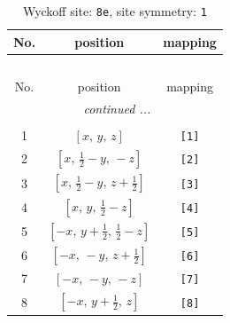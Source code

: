 \documentclass[fleqn,8pt]{jsarticle}
\begin{document}
\renewcommand{\arraystretch}{1.2}
\begin{longtable}{ccc}
\caption{Wyckoff site: {\tt 8e}, site symmetry: {\tt 1}}
 \\
 \hline \hline
No. & position & mapping \\ \hline \endfirsthead

\multicolumn{2}{l}{\tablename\ \thetable{}} \\
 \hline \hline
No. & position & mapping \\ \hline \endhead

 \hline \hline
\multicolumn{2}{r}{\footnotesize\it continued ...} \\ \endfoot

 \hline \hline
\multicolumn{2}{r}{} \\ \endlastfoot

1 & $\left[ x,\, y,\, z \right]$ & {\tt [1]} \\ \hline
2 & $\left[ x,\, \frac{1}{2} - y,\, - z \right]$ & {\tt [2]} \\ \hline
3 & $\left[ x,\, \frac{1}{2} - y,\, z + \frac{1}{2} \right]$ & {\tt [3]} \\ \hline
4 & $\left[ x,\, y,\, \frac{1}{2} - z \right]$ & {\tt [4]} \\ \hline
5 & $\left[ - x,\, y + \frac{1}{2},\, \frac{1}{2} - z \right]$ & {\tt [5]} \\ \hline
6 & $\left[ - x,\, - y,\, z + \frac{1}{2} \right]$ & {\tt [6]} \\ \hline
7 & $\left[ - x,\, - y,\, - z \right]$ & {\tt [7]} \\ \hline
8 & $\left[ - x,\, y + \frac{1}{2},\, z \right]$ & {\tt [8]} \\
\end{longtable}
\end{document}
